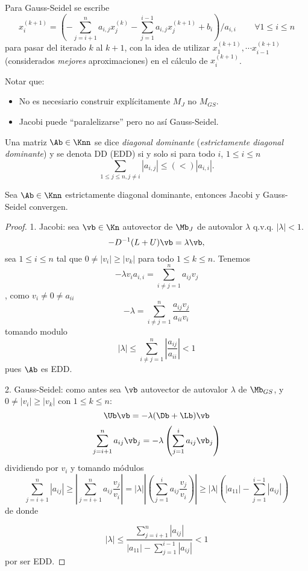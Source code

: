 Para Gauss-Seidel se escribe
$$
x_i^{(k+1)}=\left(-\sum_{j=i+1}^na_{i,j}x_j^{(k
)}-\sum_{j=1}^{i-1}a_{i,j}x_j^{(k+1)}+b_i\right)/a_{i,i}\, \qquad \forall 1\le i\le n
$$
para pasar del iterado $k$ al $k+1$, con la idea de  utilizar
$x_1^{(k+1)},\cdots x_{i-1}^{(k+1)}$ (considerados \emph{mejores} aproximaciones) en el cálculo de $x_i^{(k+1)}$.

Notar que:
\begin{itemize}
\item No es necesiario construir explícitamente $M_J$ no $M_{GS}$.
 \item Jacobi puede ``paralelizarse'' pero no así Gauss-Seidel.
\end{itemize}


\tccdefi
\begin{defi}
  \label{defi:deDD}
  Una matriz $\Ab\in \Knn$ se dice \emph{diagonal dominante} (\emph{estrictamente diagonal dominante}) y se denota DD (EDD) si y solo si para todo $i$,
 $1\le i\le n$
 $$
 \sum_{1\le j \le n, j\neq i}|a_{i,j}|\le (<) |a_{i,i}|.
 $$
  \end{defi}
 \etcc

\tcc
\begin{prop}
Sea $\Ab\in \Knn$ estrictamente diagonal dominante, entonces Jacobi y Gauss-Seidel convergen.
\end{prop}
\etcc
\begin{proof}
1. Jacobi: sea $\vb\in \Kn$ autovector de $\Mb_J$ de autovalor $\lambda$ q.v.q. $|\lambda|<1$.
$$
-D^{-1}(L+U)\vb=\lambda\vb,
$$
sea $1\le i\le n$ tal que
$0\neq |v_i|\ge |v_k|$ para todo $1\le k\le n$. Tenemos
$$
-\lambda v_ia_{i,i}=\sum_{i\neq j=1}^n a_{ij}v_j
$$, como $v_i\neq 0\neq a_{ii}$
$$
-\lambda=\sum_{i\neq j=1}^n \frac{a_{ij}v_j}{a_{ii}v_i}
$$
tomando modulo
$$
|\lambda|\le \sum_{i\neq j=1}^n |\frac{a_{ij}}{a_{ii}}|<1
$$
pues $\Ab$ es EDD.

2. Gauss-Seidel: como antes sea $\vb$ autovector de autovalor $\lambda$ de $\Mb_{GS}$, y $0\neq|v_i|\ge |v_k|$ con $1\le k\le n$:
$$
\Ub\vb=-\lambda(\Db+\Lb)\vb
$$
$$
\sum_{j=i+1}^na_{ij}\vb_j=-\lambda\left(
\sum_{j=1}^{i}a_{ij}\vb_j\right)
$$
dividiendo por $v_i$ y tomando módulos
$$
\sum_{j=i+1}^n|a_{ij}|
\ge \left|\sum_{j=i+1}^na_{ij}\frac{v_j}{v_i}\right|=|\lambda|\left|\left(
\sum_{j=1}^{i}a_{ij}\frac{v_j}{v_i}\right)\right|\ge |\lambda| \left(|a_{11}|-
\sum_{j=1}^{i-1}|a_{ij}|\right)
$$
de donde

$$
|\lambda|\le
\frac{\sum_{j=i+1}^n|a_{ij}|}{|a_{11}|-
\sum_{j=1}^{i-1}|a_{ij}|}
<1
$$
por ser EDD.
\end{proof}


